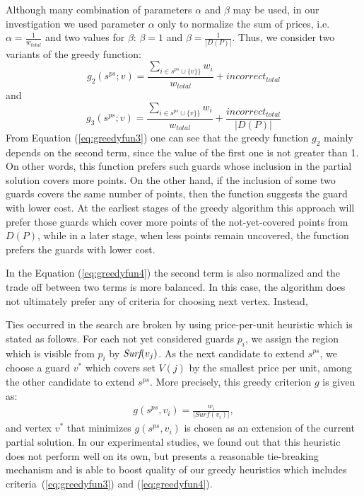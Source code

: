 \documentclass[runningheads,a4paper]{elsarticle}
\begin{document}
	Although many combination of parameters $ \alpha $ and $\beta$ may be used, in our investigation we used parameter $\alpha$  only to normalize the sum of prices, i.e. $\alpha = \frac{1}{w_{total}}$ and two values for $\beta$: $\beta = 1$ and $\beta = \frac{1}{|D(P)|}$. Thus, we consider two variants of the greedy function:
	\begin{equation}\label{eq:greedyfun3}
	g_2(s^{ps}; v)  =  \frac{\sum_{i \in s^{ps} \cup \{v\}\}} w_i}{w_{total}}+ incorrect_{total}
	\end{equation}
	and
	\begin{equation}\label{eq:greedyfun4}
	g_3(s^{ps}; v)  =    \frac{\sum_{i \in s^{ps} \cup \{v\}\}} w_i}{w_{total}}+ \frac{incorrect_{total}}{|D(P)|}
	\end{equation}
	From Equation (\ref{eq:greedyfun3}) one can see that the greedy function $g_2$ mainly depends on the second term, since the value of the first one is not greater than 1. On other words, this function prefers such guards  whose inclusion in the partial solution covers more points. On the other hand, if the inclusion of some two guards covers the same number of points, then the function suggests  the guard with lower cost. At the earliest stages of the greedy algorithm this approach will prefer those guards which cover more points of the not-yet-covered points from $D(P)$, while in a later stage, when less points remain uncovered, the function prefers the guards with lower cost. 
	
	In the Equation  (\ref{eq:greedyfun4}) the second term is also normalized and the trade off between two terms is more balanced.
	In this case, the algorithm does not  ultimately prefer any of criteria for choosing next vertex. Instead,  
	
	
	Ties occurred in the search are broken by using  price-per-unit heuristic which is stated as follows.
	For each not yet considered guards $p_i$, we assign the region which is visible from $p_i$ by $\emph{Surf}(v_j)$. As the next candidate to extend $s^{ps}$, we choose a guard $v^*$ which covers set $V(j)$ by the smallest price per unit, among the other candidate to extend $s^{ps}$. More precisely, this greedy criterion $g$ is given as:
	\begin{align}
	g(s^{ps}, v_i) = \frac{w_{i}}{|Surf({v_i})|},
	\end{align}
	and vertex $v^*$ that minimizes $g(s^{ps}, v_i)$ is chosen as an extension of the current partial solution.
	In our experimental studies, we found out that this heuristic does not perform well on its own, but presents a reasonable tie-breaking mechanism and is able to boost quality of our greedy heuristics which includes criteria~(\ref{eq:greedyfun3}) and (\ref{eq:greedyfun4}).
\end{document}
